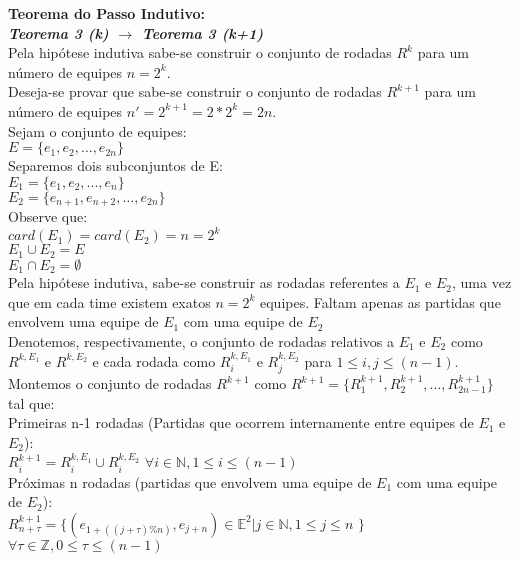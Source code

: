 \documentclass[twoside]{article}
\begin{document}
\begin{multicols}{2}
\textbf{Teorema do Passo Indutivo:}\\

\textit{\textbf{Teorema 3 (k) $\rightarrow$ Teorema 3 (k+1)}}\\
Pela hipótese indutiva sabe-se construir o conjunto de rodadas $R^k$ para um número de equipes $n=2^k$.\\
Deseja-se provar que sabe-se construir o conjunto de rodadas $R^{k+1}$ para um número de equipes $n'=2^{k+1}=2*2^k=2n$.\\
Sejam o conjunto de equipes:\\
$E = \{e_1,e_2,\dots,e_{2n}\}$\\
Separemos dois subconjuntos de E:\\
$E_1 = \{e_1,e_2,...,e_{n}\}$\\
$E_2 = \{e_{n+1},e_{n+2},\dots,e_{2n}\}$\\
Observe que:\\
$card(E_1) = card(E_2) = n= 2^k$\\
$E_1 \cup E_2 = E$\\
$E_1 \cap E_2 = \emptyset$\\
Pela hipótese indutiva, sabe-se construir as rodadas referentes a $E_1$ e $E_2$, uma vez que em cada time existem exatos $n=2^k$ equipes. Faltam apenas as partidas que envolvem uma equipe de $E_1$ com uma equipe de $E_2$ \\
Denotemos, respectivamente, o conjunto de rodadas relativos a $E_1$ e $E_2$ como $R^{k,{E_1}}$ e $R^{k,{E_2}}$ e cada rodada como $R_i^{k,{E_1}}$ e $R_j^{k,{E_2}}$ para $1 \leq i,j \leq (n-1)$.\\
Montemos o conjunto de rodadas $R^{k+1}$ como $R^{k+1}=\{R_1^{k+1},R_2^{k+1},\dots,R_{2n-1}^{k+1}\}$ tal que:\\

Primeiras n-1 rodadas (Partidas que ocorrem internamente entre equipes de $E_1$ e $E_2$):\\
 $R_i^{k+1} = R_i^{k,{E_1}} \cup R_i^{k,{E_2}}$ $ \forall i \in \mathbb{N},1 \leq i \leq (n-1)$\\

Próximas n rodadas (partidas que envolvem uma equipe de $E_1$ com uma equipe de $E_2$):\\
$R_{n+\tau}^{k+1} = \{ ( e_{1+((j+\tau)\%n)},e_{j+n}) \in \mathbb{E}^2 |  j \in \mathbb{N},1 \leq j \leq n$ $\}$ $ \forall \tau \in \mathbb{Z},0 \leq \tau \leq (n-1)$\\


\end{multicols}
\end{document}
